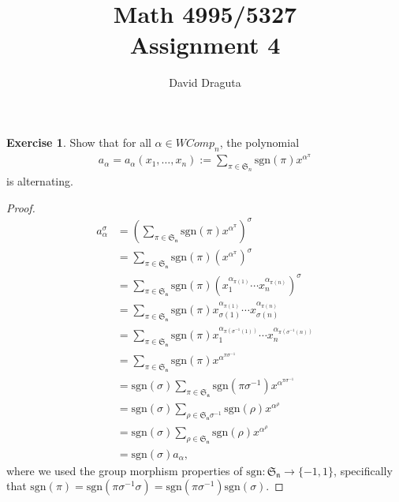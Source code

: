 \documentclass[12pt]{extarticle}
\title{ Math 4995/5327
  \\
  Assignment 4}
\author{David Draguta}
\newcommand{\set}[1]{\{#1\}}
\newcommand{\sgn}{\text{sgn}}
\newcommand{\<}{\langle}
\renewcommand{\>}{\rangle}
\theoremstyle{definition}
\newtheorem{exercise}{Exercise}
\begin{document}
\maketitle

\begin{exercise}
  Show that for all $\alpha \in WComp_n$, the polynomial
  \begin{align*}
    a_{\alpha} = a_{\alpha}(x_1, \dots, x_n) := \sum\limits_{\pi \in \mathfrak{S}_n} \sgn(\pi) x^{\alpha^{\pi}}
  \end{align*}
  is alternating.
\end{exercise}
\begin{proof}
  \begin{align*}
    a_{\alpha}^{\sigma}
    &= (\sum\limits_{\pi \in \mathfrak{S_n}} \sgn(\pi) x^{\alpha^{\pi}})^{\sigma} \\ 
    &= \sum\limits_{\pi \in \mathfrak{S_n}} \sgn(\pi) (x^{\alpha^{\pi}})^{\sigma} \\
    &= \sum\limits_{\pi \in \mathfrak{S_n}} \sgn(\pi) (x_1^{\alpha_{\pi(1)}} \cdots x_n^{\alpha_{\pi(n)}})^{\sigma} \\
    &= \sum\limits_{\pi \in \mathfrak{S_n}} \sgn(\pi) x_{\sigma(1)}^{\alpha_{\pi(1)}} \cdots x_{\sigma(n)}^{\alpha_{\pi(n)}} \\
    &= \sum\limits_{\pi \in \mathfrak{S_n}} \sgn(\pi) x_{1}^{\alpha_{\pi(\sigma^{-1}(1))}} \cdots x_{n}^{\alpha_{\pi(\sigma^{-1}(n))}} \\
    &= \sum\limits_{\pi \in \mathfrak{S_n}} \sgn(\pi) x^{\alpha^{\pi\sigma^{-1}}} \\
    &= \sgn(\sigma)\sum\limits_{\pi \in \mathfrak{S_n}} \sgn(\pi\sigma^{-1}) x^{\alpha^{\pi\sigma^{-1}}} \\
    &= \sgn(\sigma)\sum\limits_{\rho \in \mathfrak{S_n}\sigma^{-1}} \sgn(\rho) x^{\alpha^{\rho}} \\
    &= \sgn(\sigma)\sum\limits_{\rho \in \mathfrak{S_n}} \sgn(\rho) x^{\alpha^{\rho}} \\
    &= \sgn(\sigma)a_{\alpha},
  \end{align*}
  where we used the group morphism properties of $\sgn: \mathfrak{S_n} \to \set{-1,1}$, specifically that
  $\sgn(\pi) = \sgn(\pi \sigma^{-1} \sigma) = \sgn(\pi \sigma^{-1}) \sgn(\sigma)$.
\end{proof}
\end{document}
